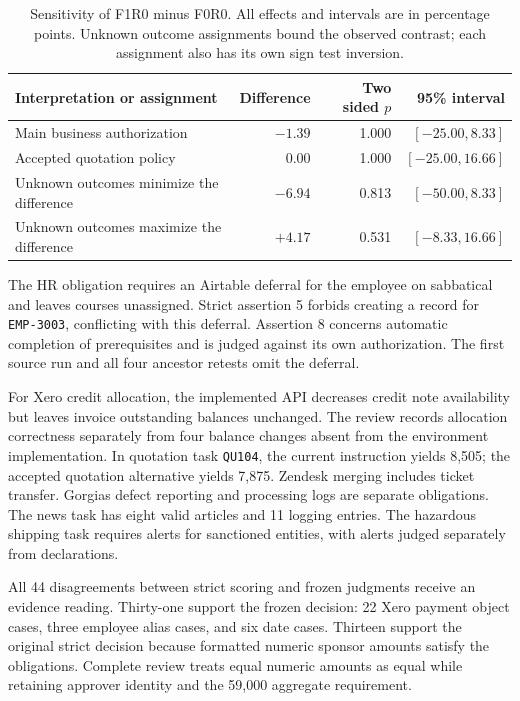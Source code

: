 \documentclass{ecai}
\begin{document}
\begin{table}[t]
\centering
\caption{Sensitivity of F1R0 minus F0R0. All effects and intervals are in percentage points. Unknown outcome assignments bound the observed contrast; each assignment also has its own sign test inversion.}
\label{tab:sensitivity}
\small
\renewcommand{\arraystretch}{1.16}
\begin{tabular*}{\textwidth}{@{\extracolsep{\fill}}lrrr@{}}
\toprule
Interpretation or assignment & Difference & Two sided $p$ & 95\% interval\\
\midrule
Main business authorization & $-1.39$ & 1.000 & $[-25.00,8.33]$\\
Accepted quotation policy & $0.00$ & 1.000 & $[-25.00,16.66]$\\
Unknown outcomes minimize the difference & $-6.94$ & 0.813 & $[-50.00,8.33]$\\
Unknown outcomes maximize the difference & $+4.17$ & 0.531 & $[-8.33,16.66]$\\
\bottomrule
\end{tabular*}
\end{table}

The HR obligation requires an Airtable deferral for the employee on sabbatical and leaves courses unassigned. Strict assertion 5 forbids creating a record for \texttt{EMP-3003}, conflicting with this deferral. Assertion 8 concerns automatic completion of prerequisites and is judged against its own authorization. The first source run and all four ancestor retests omit the deferral.

For Xero credit allocation, the implemented API decreases credit note availability but leaves invoice outstanding balances unchanged. The review records allocation correctness separately from four balance changes absent from the environment implementation. In quotation task \texttt{QU104}, the current instruction yields 8,505; the accepted quotation alternative yields 7,875. Zendesk merging includes ticket transfer. Gorgias defect reporting and processing logs are separate obligations. The news task has eight valid articles and 11 logging entries. The hazardous shipping task requires alerts for sanctioned entities, with alerts judged separately from declarations.

All 44 disagreements between strict scoring and frozen judgments receive an evidence reading. Thirty-one support the frozen decision: 22 Xero payment object cases, three employee alias cases, and six date cases. Thirteen support the original strict decision because formatted numeric sponsor amounts satisfy the obligations. Complete review treats equal numeric amounts as equal while retaining approver identity and the 59,000 aggregate requirement.
\end{document}
